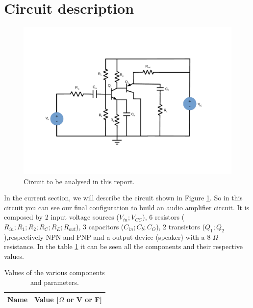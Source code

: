 \section{Circuit description}
\label{sec:analysis}

\begin{figure}[h] \centering
\includegraphics[width=0.9\linewidth]{../figlib/lab4.pdf}
\caption{Circuit to be analysed in this report.}
\label{fig:lab4}
\end{figure}


In the current section, we will describe the circuit shown in Figure \ref{fig:lab4}. 
So in this circuit you can see our final configuration to build an audio amplifier circuit. It is composed by 2 input voltage sources ($V_{in}; V_{CC}$), 
6 resistors ($R_{in}; R_{1}; R_{2}; R_{C}; R_{E}; R_{out}$), 
3 capacitors ($C_{in}; C_{b}; C_{O}$), 2 transistors ($Q_{1}; Q_{2}$),respectively NPN and PNP and a output device (speaker) with a 8 $\Omega$ resistance.
In the table \ref{tab:circuit_values} it can be seen all the components and their respective values.


\begin{table}[h]
  \centering
  \begin{tabular}{|l|r|}
    \hline    
    {\bf Name} & {\bf Value [{$\Omega$} or V or F]} \\ \hline
    
  \end{tabular}
  \caption{Values of the various components and parameters.}
  \label{tab:circuit_values}
\end{table}


